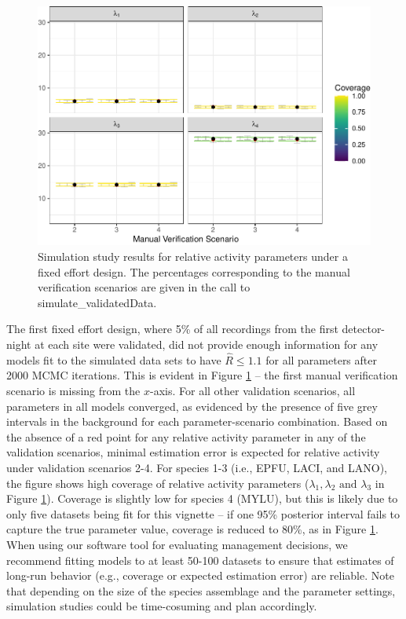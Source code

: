 \documentclass[
]{article}
\begin{document}
\begin{figure}
\centering
\includegraphics{Vignette_files/figure-latex/FElambda-1.pdf}
\caption{\label{fig:FElambda}Simulation study results for relative activity parameters under a fixed effort design. The percentages corresponding to the manual verification scenarios are given in the call to simulate\_validatedData.}
\end{figure}

\linespread{1}

The first fixed effort design, where 5\% of all recordings from the first detector-night at each site were validated, did not provide enough information for any models fit to the simulated data sets to have \(\hat{R} \leq 1.1\) for all parameters after 2000 MCMC iterations. This is evident in Figure \ref{fig:FElambda} -- the first manual verification scenario is missing from the \(x\)-axis. For all other validation scenarios, all parameters in all models converged, as evidenced by the presence of five grey intervals in the background for each parameter-scenario combination. Based on the absence of a red point for any relative activity parameter in any of the validation scenarios, minimal estimation error is expected for relative activity under validation scenarios 2-4. For species 1-3 (i.e., EPFU, LACI, and LANO), the figure shows high coverage of relative activity parameters (\(\lambda_1, \lambda_2 \text{ and } \lambda_3\) in Figure \ref{fig:FElambda}). Coverage is slightly low for species 4 (MYLU), but this is likely due to only five datasets being fit for this vignette -- if one 95\% posterior interval fails to capture the true parameter value, coverage is reduced to 80\%, as in Figure \ref{fig:FElambda}. When using our software tool for evaluating management decisions, we recommend fitting models to at least 50-100 datasets to ensure that estimates of long-run behavior (e.g., coverage or expected estimation error) are reliable. Note that depending on the size of the species assemblage and the parameter settings, simulation studies could be time-cosuming and plan accordingly.
\end{document}
